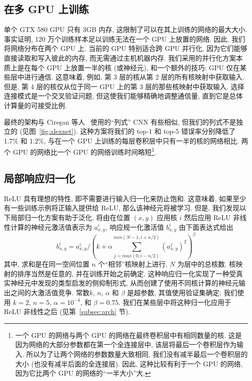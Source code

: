 \documentclass{article} %
\begin{document}
\vspace{-1mm}
\subsection{在多 GPU 上训练}
\vspace{-2ex}
单个 GTX 580 GPU 只有 3GB 内存, 这限制了可以在其上训练的网络的最大大小. 事实证明, 120 万个训练样本足以训练无法在一个 GPU 上放置的网络. 因此, 我们将网络分布在两个 GPU 上. 当前的 GPU 特别适合跨 GPU 并行化, 因为它们能够直接读取和写入彼此的内存, 而无需通过主机机器内存. 我们采用的并行化方案本质上是在每个 GPU 上放置一半的核 (或神经元), 和一个额外的技巧: GPU 仅在某些层中进行通信. 这意味着, 例如, 第 3 层的核从第 2 层的所有核映射中获取输入. 但是, 第 4 层的核仅从位于同一 GPU 上的第 3 层的那些核映射中获取输入. 选择连接模式是一个交叉验证问题, 但这使我们能够精确地调整通信量, 直到它是总体计算量的可接受比例.

最终的架构与 Cire\c{s}an 等人~\cite{cire2011} 使用的“列式” CNN 有些相似, 但我们的列式不是独立的 (见图~\ref{fig:alexnet}). 这种方案将我们的 top-1 和 top-5 错误率分别降低了 1.7\% 和 1.2\%, 与在一个 GPU 上训练的每层卷积层中只有一半的核的网络相比. 两个 GPU 的网络比一个 GPU 的网络训练时间略短\footnote{一个 GPU 的网络与两个 GPU 的网络在最终卷积层中有相同数量的核. 这是因为网络的大部分参数都在第一个全连接层中, 该层将最后一个卷积层作为输入. 所以为了让两个网络的参数数量大致相同, 我们没有减半最后一个卷积层的大小 (也没有减半后面的全连接层). 因此, 这种比较有利于一个 GPU 的网络, 因为它比两个 GPU 的网络的“一半大小”大.}.

\vspace{-1mm}
\subsection{局部响应归一化}
\vspace{-2ex}
ReLU 具有理想的特性, 即不需要进行输入归一化来防止饱和. 这意味着, 如果至少有一些训练示例将正输入提供给 ReLU, 那么该神经元将被学习. 但是, 我们发现以下局部归一化方案有助于泛化. 将由在位置 $(x,y)$ 应用核 $i$ 然后应用 ReLU 非线性计算的神经元激活值表示为 $a^i_{x,y}$, 响应规一化激活值 $b^i_{x,y}$ 由下面表达式给出
\[
b^i_{x, y} = a^i_{x, y} / \left( k + \alpha \sum^{min(N-1, i+n/2)}_{j=max(0, i-n/2)} (a^j_{x, y})^2 \right)^\beta 
\]
​
其中, 求和是在同一空间位置 $n$ 个“相邻”核映射上进行, $N$ 为层中的总核数.  核映射的排序当然是任意的, 并在训练开始之前确定. 这种响应归一化实现了一种受真实神经元中发现的类型启发的侧抑制形式, 从而创建了使用不同核计算的神经元输出之间的大激活值竞争. 常数$k$, $n$, $\alpha$ 和 $\beta$ 是超参数, 其值使用验证集确定; 我们使用 $k=2$, $n=5$, $\alpha = 10^{-4}$, 和 $\beta = 0.75$. 我们在某些层中将这种归一化应用于 ReLU 非线性之后 (见第~\ref{subsec:arch} 节).
\end{document}
